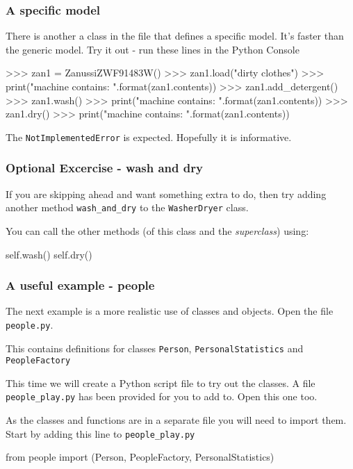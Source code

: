 \documentclass{beamer}
\begin{document}
\begin{frame}[fragile]
\frametitle{A specific model}

There is another a class in the file that defines a specific model.
It's faster than the generic model. 
Try it out - run these lines in the Python Console

\begin{code} 
>>> zan1 = ZanussiZWF91483W()
>>> zan1.load("dirty clothes")
>>> print("machine contains: {}".format(zan1.contents))
>>> zan1.add_detergent()
>>> zan1.wash()
>>> print("machine contains: {}".format(zan1.contents))
>>> zan1.dry()
>>> print("machine contains: {}".format(zan1.contents))
\end{code}
The \texttt{NotImplementedError} is expected. Hopefully it is informative.

\end{frame}

\begin{frame}[fragile]
\frametitle{Optional Excercise - wash and dry}

If you are skipping ahead and want something extra to do,
then try adding another method \texttt{wash\_and\_dry} to
the \texttt{WasherDryer} class.

You can call the other methods (of this class and the \emph{superclass})
using:

\begin{shaded}
\begin{code} 
        self.wash()
        self.dry()
\end{code}
\end{shaded}
\end{frame}

\begin{frame}[fragile]
\frametitle{A useful example - people}

The next example is a more realistic use of classes and objects.
Open the file \texttt{people.py}. 

This contains definitions for classes \texttt{Person},
 \texttt{PersonalStatistics} and \texttt{PeopleFactory}

This time we will create a Python script file to try out the classes. 
A file \texttt{people\_play.py} has been provided for you to add to. Open this one too.

As the classes and functions are in a separate file you will need to import them. 
Start by adding this line to \texttt{people\_play.py}

\begin{shaded}
\begin{code} 
from people import (Person, PeopleFactory, 
                    PersonalStatistics)
\end{code}
\end{shaded}
\end{frame}
\end{document}
